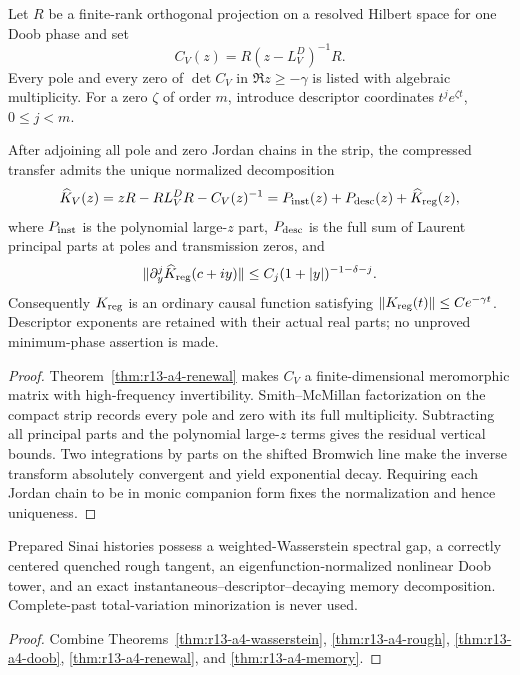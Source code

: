 Let $R$ be a finite-rank orthogonal projection on a resolved Hilbert space for
one Doob phase and set
\[
 C_V(z)=R(z-L_V^D)^{-1}R.
\]
Every pole and every zero of $\det C_V$ in
$\Re z\ge-\gamma$ is listed with algebraic multiplicity.  For a zero
$\zeta$ of order $m$, introduce descriptor coordinates
$t^je^{\zeta t}$, $0\le j<m$.

\begin{theorem}
\label{thm:r13-a4-memory}
After adjoining all pole and zero Jordan chains in the strip, the compressed
transfer admits the unique normalized decomposition
\[
 \widehat K_V(z)=zR-RL_V^DR-C_V(z)^{-1}
 =P_{\rm inst}(z)+P_{\rm desc}(z)+\widehat K_{\rm reg}(z),
\]
where $P_{\rm inst}$ is the polynomial large-$z$ part,
$P_{\rm desc}$ is the full sum of Laurent principal parts at poles and
transmission zeros, and
\[
 \|\partial_y^j\widehat K_{\rm reg}(c+iy)\|
 \le C_j(1+|y|)^{-1-\delta-j}.
\]
Consequently $K_{\rm reg}$ is an ordinary causal function satisfying
$\|K_{\rm reg}(t)\|\le Ce^{-\gamma t}$.  Descriptor exponents are retained
with their actual real parts; no unproved minimum-phase assertion is made.
\end{theorem}

\begin{proof}
Theorem~\ref{thm:r13-a4-renewal} makes $C_V$ a finite-dimensional meromorphic
matrix with high-frequency invertibility.  Smith--McMillan factorization on
the compact strip records every pole and zero with its full multiplicity.
Subtracting all principal parts and the polynomial large-$z$ terms gives the
residual vertical bounds.  Two integrations by parts on the shifted Bromwich
line make the inverse transform absolutely convergent and yield exponential
decay.  Requiring each Jordan chain to be in monic companion form fixes the
normalization and hence uniqueness.
\end{proof}

\begin{theorem}
\label{thm:r13-a4-main}
Prepared Sinai histories possess a weighted-Wasserstein spectral gap, a
correctly centered quenched rough tangent, an eigenfunction-normalized
nonlinear Doob tower, and an exact instantaneous--descriptor--decaying memory
decomposition.  Complete-past total-variation minorization is never used.
\end{theorem}

\begin{proof}
Combine Theorems~\ref{thm:r13-a4-wasserstein},
\ref{thm:r13-a4-rough}, \ref{thm:r13-a4-doob},
\ref{thm:r13-a4-renewal}, and \ref{thm:r13-a4-memory}.
\end{proof}
